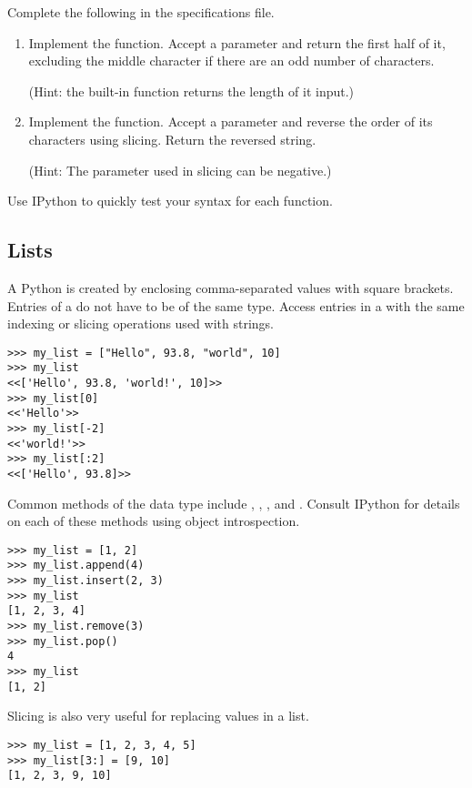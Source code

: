 \begin{problem}
Complete the following in the specifications file.
\begin{enumerate}
\item Implement the  function.
Accept a parameter  and return the first half of it, excluding the middle character if there are an odd number of characters.

(Hint: the built-in  function returns the length of it input.)
\item Implement the  function.
Accept a parameter  and reverse the order of its characters using slicing.
Return the reversed string.

(Hint: The  parameter used in slicing can be negative.)
\end{enumerate}
Use IPython to quickly test your syntax for each function.
\end{problem}


\subsection*{Lists}
A Python  is created by enclosing comma-separated values with square brackets.
Entries of a  do not have to be of the same type.
Access entries in a  with the same indexing or slicing operations used with strings.
\begin{lstlisting}
>>> my_list = ["Hello", 93.8, "world", 10]
>>> my_list
<<['Hello', 93.8, 'world!', 10]>>
>>> my_list[0]
<<'Hello'>>
>>> my_list[-2]
<<'world!'>>
>>> my_list[:2]
<<['Hello', 93.8]>>
\end{lstlisting}

Common methods of the  data type include , , , and .
Consult IPython for details on each of these methods using object introspection.
\begin{lstlisting}
>>> my_list = [1, 2]
>>> my_list.append(4)
>>> my_list.insert(2, 3)
>>> my_list
[1, 2, 3, 4]
>>> my_list.remove(3)
>>> my_list.pop()
4
>>> my_list
[1, 2]
\end{lstlisting}

Slicing is also very useful for replacing values in a list.
\begin{lstlisting}
>>> my_list = [1, 2, 3, 4, 5]
>>> my_list[3:] = [9, 10]
[1, 2, 3, 9, 10]
\end{lstlisting}

